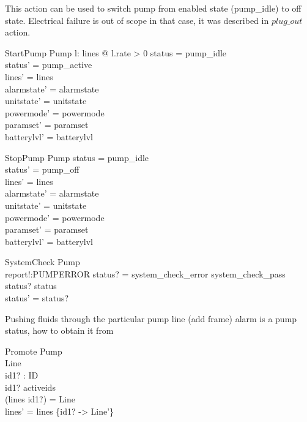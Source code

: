 \documentclass{article}
\begin{document}
	
	
			This action can be used to switch pump from enabled state (pump\_idle) to off state. Electrical failure is out of scope in that case, it was described in $plug\_out$ action. 	
			
	\begin{schema}{StartPump}
		\Delta Pump
	\where
		\exists l: \ran lines @ l.rate > 0
		status = pump\_idle \\ 
		status' = pump\_active \\
		lines' = lines  \\
    	alarmstate' = alarmstate \\
    	unitstate' = unitstate \\
    	powermode' = powermode \\
		paramset' = paramset\\
		batterylvl' = batterylvl
	\end{schema}
	

		
	\begin{schema}{StopPump}
		\Delta Pump
	\where
		status = pump\_idle \\ 
		status' = pump\_off \\
		lines' = lines  \\
    	alarmstate' = alarmstate \\
    	unitstate' = unitstate \\
    	powermode' = powermode \\
		paramset' = paramset\\
		batterylvl' = batterylvl
	\end{schema}	
			
	
			
	\begin{schema}{SystemCheck}
		\Delta Pump\\
		report!:PUMPERROR
	\where 
		status? = system\_check\_error \lor system\_check\_pass \\
		status? \neq status\\
		status' = status?
	\end{schema}
	
	
	Pushing fluids through the particular pump line (add frame) alarm is a pump status, how to obtain it from
	
	\begin{schema}{Promote}
		\Delta Pump	\\
		\Delta Line \\
		id1? : ID \\
	\where 
		id1? \in activeids \\
		(lines id1?) = \theta Line \\
		lines' = lines \oplus \{id1? -> \theta Line'\} \\		
	\end{schema}
	
\end{document}
